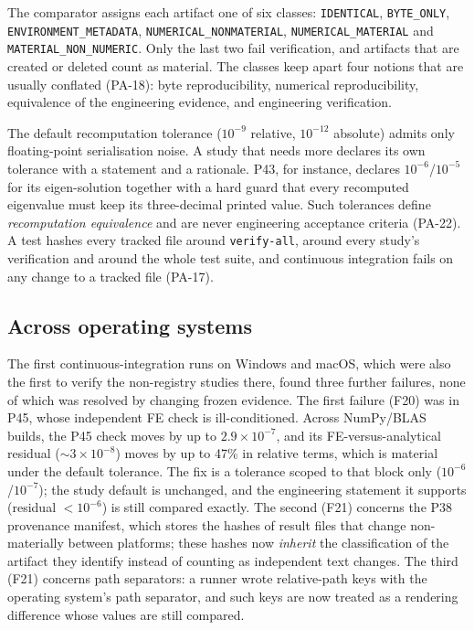 The comparator assigns each artifact one of six classes: \texttt{IDENTICAL}, \texttt{BYTE\_\allowbreak{}ONLY}, \texttt{ENVIRONMENT\_\allowbreak{}METADATA}, \texttt{NUMERICAL\_\allowbreak{}NONMATERIAL}, \texttt{NUMERICAL\_\allowbreak{}MATERIAL} and \texttt{MATERIAL\_\allowbreak{}NON\_\allowbreak{}NUMERIC}. Only the last two fail verification, and artifacts that are created or deleted count as material. The classes keep apart four notions that are usually conflated (PA-18): byte reproducibility, numerical reproducibility, equivalence of the engineering evidence, and engineering verification.

The default recomputation tolerance ($10^{-9}$ relative, $10^{-12}$ absolute) admits only floating-point serialisation noise. A study that needs more declares its own tolerance with a statement and a rationale. P43, for instance, declares $10^{-6}$/$10^{-5}$ for its eigen-solution together with a hard guard that every recomputed eigenvalue must keep its three-decimal printed value. Such tolerances define \emph{recomputation equivalence} and are never engineering acceptance criteria (PA-22). A test hashes every tracked file around \texttt{verify-all}, around every study's verification and around the whole test suite, and continuous integration fails on any change to a tracked file (PA-17).

\subsection{Across operating systems}
The first continuous-integration runs on Windows and macOS, which were also the first to verify the non-registry studies there, found three further failures, none of which was resolved by changing frozen evidence. The first failure (F20) was in P45, whose independent FE check is ill-conditioned. Across NumPy/BLAS builds, the P45 check moves by up to $2.9\times10^{-7}$, and its FE-versus-analytical residual (${\sim}3\times10^{-8}$) moves by up to 47\% in relative terms, which is material under the default tolerance. The fix is a tolerance scoped to that block only ($10^{-6}$/$10^{-7}$); the study default is unchanged, and the engineering statement it supports (residual $<10^{-6}$) is still compared exactly. The second (F21) concerns the P38 provenance manifest, which stores the hashes of result files that change non-materially between platforms; these hashes now \emph{inherit} the classification of the artifact they identify instead of counting as independent text changes. The third (F21) concerns path separators: a runner wrote relative-path keys with the operating system's path separator, and such keys are now treated as a rendering difference whose values are still compared.

